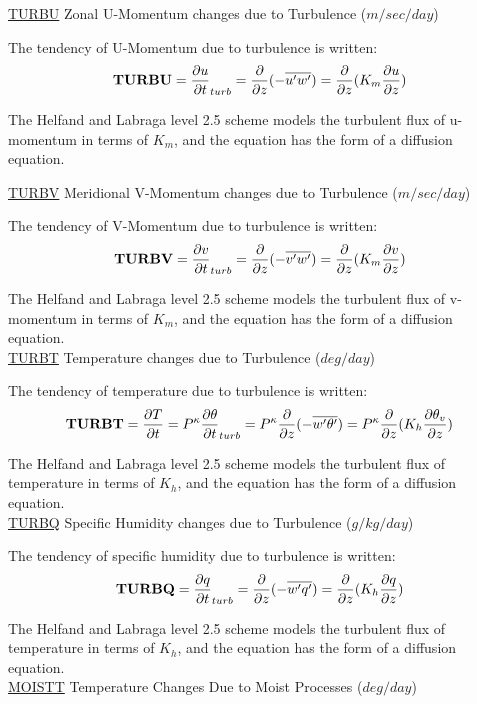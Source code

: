 \noindent
{ \underline {TURBU}  Zonal U-Momentum changes due to Turbulence ($m/sec/day$) }
 
\noindent
The tendency of U-Momentum due to turbulence is written:
\[
{\bf TURBU} = {\frac{\partial u}{\partial t}}_{turb} = {\frac{\partial }{\partial z} }{(- \overline{u^{\prime}w^{\prime}})}
 = {\frac{\partial }{\partial z} }{(K_m \frac{\partial u}{\partial z})}
\]

\noindent
The Helfand and Labraga level 2.5 scheme models the turbulent
flux of u-momentum in terms of $K_m$, and the equation has the form of a diffusion
equation.
 
\noindent
{ \underline {TURBV}  Meridional V-Momentum changes due to Turbulence ($m/sec/day$) }
 
\noindent
The tendency of V-Momentum due to turbulence is written:
\[
{\bf TURBV} = {\frac{\partial v}{\partial t}}_{turb} = {\frac{\partial }{\partial z} }{(- \overline{v^{\prime}w^{\prime}})}
 = {\frac{\partial }{\partial z} }{(K_m \frac{\partial v}{\partial z})}
\]

\noindent
The Helfand and Labraga level 2.5 scheme models the turbulent
flux of v-momentum in terms of $K_m$, and the equation has the form of a diffusion
equation.
\\
 
\noindent
{ \underline {TURBT}  Temperature changes due to Turbulence ($deg/day$) }
 
\noindent
The tendency of temperature due to turbulence is written:
\[
{\bf TURBT} = {\frac{\partial T}{\partial t}} = P^{\kappa}{\frac{\partial \theta}{\partial t}}_{turb} = 
P^{\kappa}{\frac{\partial }{\partial z} }{(- \overline{w^{\prime}\theta^{\prime}})}
 = P^{\kappa}{\frac{\partial }{\partial z} }{(K_h \frac{\partial \theta_v}{\partial z})}
\]

\noindent
The Helfand and Labraga level 2.5 scheme models the turbulent
flux of temperature in terms of $K_h$, and the equation has the form of a diffusion
equation.
\\
 
\noindent
{ \underline {TURBQ}  Specific Humidity changes due to Turbulence ($g/kg/day$) }
 
\noindent
The tendency of specific humidity due to turbulence is written:
\[
{\bf TURBQ} = {\frac{\partial q}{\partial t}}_{turb} = {\frac{\partial }{\partial z} }{(- \overline{w^{\prime}q^{\prime}})}
 = {\frac{\partial }{\partial z} }{(K_h \frac{\partial q}{\partial z})}
\]

\noindent
The Helfand and Labraga level 2.5 scheme models the turbulent
flux of temperature in terms of $K_h$, and the equation has the form of a diffusion
equation.
\\
 
\noindent
{ \underline {MOISTT} Temperature Changes Due to Moist Processes ($deg/day$) } 

